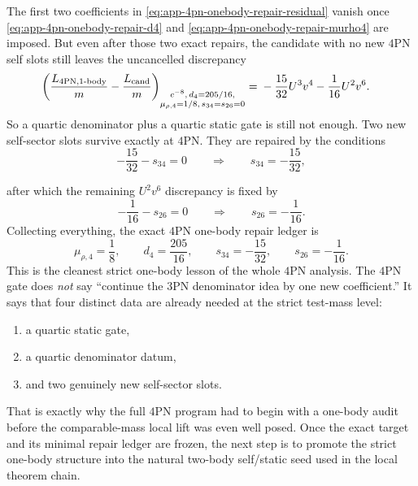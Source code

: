 \documentclass[11pt]{article}
\begin{document}
The first two coefficients in
\eqref{eq:app-4pn-onebody-repair-residual} vanish once
\eqref{eq:app-4pn-onebody-repair-d4} and
\eqref{eq:app-4pn-onebody-repair-murho4} are imposed.  But even after those two
exact repairs, the candidate with no new $4$PN self slots still leaves the
uncancelled discrepancy
\begin{equation}
\begin{aligned}
\left(\frac{L_{4\mathrm{PN},1\text{-body}}}{m}-\frac{L_{\rm cand}}{m}\right)_{
\substack{
c^{-8},\,d_4=205/16,\\
\mu_{\rho,4}=1/8,\,s_{34}=s_{26}=0
}}
={}&
-\frac{15}{32}U^3v^4-\frac1{16}U^2v^6.
\end{aligned}
\label{eq:app-4pn-onebody-repair-two-slot-mismatch}
\end{equation}
So a quartic denominator plus a quartic static gate is still not enough.  Two
new self-sector slots survive exactly at $4$PN.  They are repaired by the
conditions
\begin{equation}
-\frac{15}{32}-s_{34}=0
\qquad\Longrightarrow\qquad
\boxed{s_{34}=-\frac{15}{32},}
\label{eq:app-4pn-onebody-repair-s34}
\end{equation}

after which the remaining $U^2v^6$ discrepancy is fixed by
\begin{equation}
-\frac1{16}-s_{26}=0
\qquad\Longrightarrow\qquad
\boxed{s_{26}=-\frac1{16}.}
\label{eq:app-4pn-onebody-repair-s26}
\end{equation}
Collecting everything, the exact $4$PN one-body repair ledger is
\begin{equation}
\boxed{
\mu_{\rho,4}=\frac18,
\qquad
 d_4=\frac{205}{16},
\qquad
 s_{34}=-\frac{15}{32},
\qquad
 s_{26}=-\frac1{16}.
}
\label{eq:app-4pn-onebody-repair-ledger}
\end{equation}
This is the cleanest strict one-body lesson of the whole $4$PN analysis.  The
$4$PN gate does \emph{not} say ``continue the $3$PN denominator idea by one new
coefficient.''  It says that four distinct data are already needed at the
strict test-mass level:
\begin{enumerate}
    \item a quartic static gate,
    \item a quartic denominator datum,
    \item and two genuinely new self-sector slots.
\end{enumerate}
That is exactly why the full $4$PN program had to begin with a one-body audit
before the comparable-mass local lift was even well posed.  Once the exact
target and its minimal repair ledger are frozen, the next step is to promote the
strict one-body structure into the natural two-body self/static seed used in the
local theorem chain.
\end{document}
